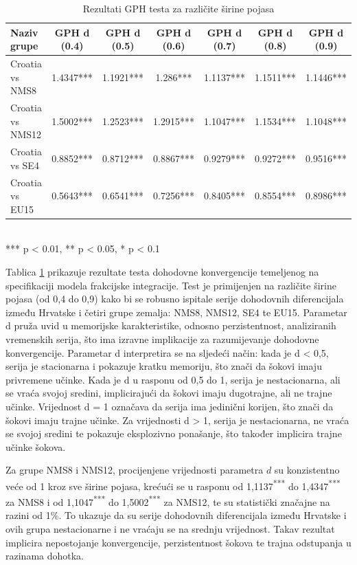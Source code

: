 \documentclass{crebsshr}
\begin{document}
\begin{table}[ht]
\centering
\caption{Rezultati GPH testa za različite širine pojasa}
\label{tab:tablica4}
\begin{tabular}{lcccccc}
\toprule
\textbf{Naziv grupe} & \textbf{GPH d (0.4)} & \textbf{GPH d (0.5)} & \textbf{GPH d (0.6)} & \textbf{GPH d (0.7)} & \textbf{GPH d (0.8)} & \textbf{GPH d (0.9)} \\
\midrule
Croatia vs NMS8   & 1.4347*** & 1.1921*** & 1.286***  & 1.1137*** & 1.1511*** & 1.1446*** \\
Croatia vs NMS12  & 1.5002*** & 1.2523*** & 1.2915*** & 1.1047*** & 1.1534*** & 1.1048*** \\
Croatia vs SE4    & 0.8852*** & 0.8712*** & 0.8867*** & 0.9279*** & 0.9272*** & 0.9516*** \\
Croatia vs EU15   & 0.5643*** & 0.6541*** & 0.7256*** & 0.8405*** & 0.8554*** & 0.8986*** \\
\bottomrule
\end{tabular}
\\
\footnotesize{*** p < 0.01, ** p < 0.05, * p < 0.1}
\end{table}
Tablica \ref{tab:tablica4} prikazuje rezultate testa dohodovne konvergencije temeljenog na specifikaciji modela frakcijske integracije. Test je primijenjen na različite širine pojasa (od 0,4 do 0,9) kako bi se robusno ispitale serije dohodovnih diferencijala između Hrvatske i četiri grupe zemalja: NMS8, NMS12, SE4 te EU15. Parametar d pruža uvid u memorijske karakteristike, odnosno perzistentnost, analiziranih vremenskih serija, što ima izravne implikacije za razumijevanje dohodovne konvergencije. Parametar d interpretira se na sljedeći način: kada je d < 0,5, serija je stacionarna i pokazuje kratku memoriju, što znači da šokovi imaju privremene učinke. Kada je d u rasponu od 0,5 do 1, serija je nestacionarna, ali se vraća svojoj sredini, implicirajući da šokovi imaju dugotrajne, ali ne trajne učinke. Vrijednost d = 1 označava da serija ima jedinični korijen, što znači da šokovi imaju trajne učinke. Za vrijednosti d > 1, serija je nestacionarna, ne vraća se svojoj sredini te pokazuje eksplozivno ponašanje, što također implicira trajne učinke šokova.

Za grupe NMS8 i NMS12, procijenjene vrijednosti parametra $d$ su konzistentno veće od 1 kroz sve širine pojasa, krećući se u rasponu od 1,1137\textsuperscript{***} do 1,4347\textsuperscript{***} za NMS8 i od 1,1047\textsuperscript{***} do 1,5002\textsuperscript{***} za NMS12, te su statistički značajne na razini od 1\%. To ukazuje da su serije dohodovnih diferencijala između Hrvatske i ovih grupa nestacionarne i ne vraćaju se na srednju vrijednost. Takav rezultat implicira nepostojanje konvergencije, perzistentnost šokova te trajna odstupanja u razinama dohotka. 
\end{document}
